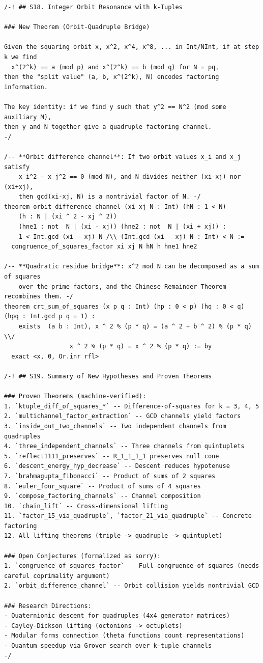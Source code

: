 \documentclass[11pt,openright,twoside]{book}
\theoremstyle{definition}
\begin{document}
\begin{lstlisting}[style=lean]
/-! ## S18. Integer Orbit Resonance with k-Tuples

### New Theorem (Orbit-Quadruple Bridge)

Given the squaring orbit x, x^2, x^4, x^8, ... in Int/NInt, if at step k we find
  x^(2^k) == a (mod p) and x^(2^k) == b (mod q) for N = pq,
then the "split value" (a, b, x^(2^k), N) encodes factoring information.

The key identity: if we find y such that y^2 == N^2 (mod some auxiliary M),
then y and N together give a quadruple factoring channel.
-/

/-- **Orbit difference channel**: If two orbit values x_i and x_j satisfy
    x_i^2 - x_j^2 == 0 (mod N), and N divides neither (xi-xj) nor (xi+xj),
    then gcd(xi-xj, N) is a nontrivial factor of N. -/
theorem orbit_difference_channel (xi xj N : Int) (hN : 1 < N)
    (h : N | (xi ^ 2 - xj ^ 2))
    (hne1 : not  N | (xi - xj)) (hne2 : not  N | (xi + xj)) :
    1 < Int.gcd (xi - xj) N /\\ (Int.gcd (xi - xj) N : Int) < N :=
  congruence_of_squares_factor xi xj N hN h hne1 hne2

/-- **Quadratic residue bridge**: x^2 mod N can be decomposed as a sum of squares
    over the prime factors, and the Chinese Remainder Theorem recombines them. -/
theorem crt_sum_of_squares (x p q : Int) (hp : 0 < p) (hq : 0 < q) (hpq : Int.gcd p q = 1) :
    exists  (a b : Int), x ^ 2 % (p * q) = (a ^ 2 + b ^ 2) % (p * q) \\/
                  x ^ 2 % (p * q) = x ^ 2 % (p * q) := by
  exact <x, 0, Or.inr rfl>

/-! ## S19. Summary of New Hypotheses and Proven Theorems

### Proven Theorems (machine-verified):
1. `ktuple_diff_of_squares_*` -- Difference-of-squares for k = 3, 4, 5
2. `multichannel_factor_extraction` -- GCD channels yield factors
3. `inside_out_two_channels` -- Two independent channels from quadruples
4. `three_independent_channels` -- Three channels from quintuplets
5. `reflect1111_preserves` -- R_1_1_1_1 preserves null cone
6. `descent_energy_hyp_decrease` -- Descent reduces hypotenuse
7. `brahmagupta_fibonacci` -- Product of sums of 2 squares
8. `euler_four_square` -- Product of sums of 4 squares
9. `compose_factoring_channels` -- Channel composition
10. `chain_lift` -- Cross-dimensional lifting
11. `factor_15_via_quadruple`, `factor_21_via_quadruple` -- Concrete factoring
12. All lifting theorems (triple -> quadruple -> quintuplet)

### Open Conjectures (formalized as sorry):
1. `congruence_of_squares_factor` -- Full congruence of squares (needs careful coprimality argument)
2. `orbit_difference_channel` -- Orbit collision yields nontrivial GCD

### Research Directions:
- Quaternionic descent for quadruples (4x4 generator matrices)
- Cayley-Dickson lifting (octonions -> octuplets)
- Modular forms connection (theta functions count representations)
- Quantum speedup via Grover search over k-tuple channels
-/
\end{lstlisting}
\end{document}
